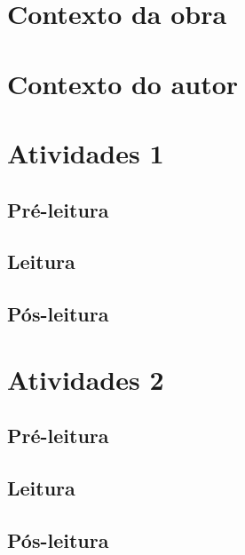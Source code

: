 \section{Contexto da obra}


\lipsum[1-4]


\section{Contexto do autor}


\section{Atividades 1}




\subsection{Pré-leitura}
\subsection{Leitura}
\subsection{Pós-leitura}



\section{Atividades 2}

\subsection{Pré-leitura}
\subsection{Leitura}
\subsection{Pós-leitura}






